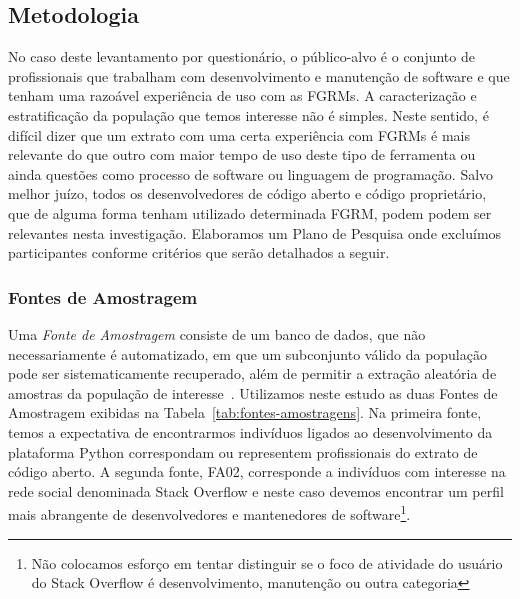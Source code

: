 \subsection{Metodologia}
\label{subsec:pesq_metodologias}

No caso deste levantamento por questionário, o público-alvo é o conjunto de
profissionais que trabalham com desenvolvimento e manutenção de software e que
tenham uma razoável experiência de uso com as FGRMs. A caracterização e
estratificação da população que temos interesse não é simples. Neste sentido, é
difícil dizer que um extrato com uma certa experiência com FGRMs é mais
relevante do que outro com maior tempo de uso deste tipo de ferramenta ou ainda
questões como processo de software ou linguagem de programação. Salvo melhor
juízo, todos os desenvolvedores de código aberto e código proprietário, que de
alguma forma tenham utilizado determinada FGRM, podem podem ser relevantes nesta
investigação. Elaboramos um Plano de Pesquisa onde excluímos participantes
conforme critérios que serão detalhados a seguir.

\subsubsection{Fontes de Amostragem}
\label{subsubsec:fontes_amostragem}

Uma \textit{Fonte de Amostragem} consiste de um banco de dados, que não
necessariamente é automatizado, em que um subconjunto válido da população pode
ser sistematicamente recuperado, além de permitir a extração aleatória de
amostras da população de interesse~\cite{de2014towards}. Utilizamos neste estudo
as duas Fontes de Amostragem exibidas na Tabela~\ref{tab:fontes-amostragens}.
Na primeira fonte, temos a expectativa de encontrarmos indivíduos ligados ao
desenvolvimento da plataforma Python correspondam ou representem profissionais
do extrato de código aberto. A segunda fonte, FA02, corresponde a indivíduos com
interesse na rede social denominada Stack Overflow e neste caso devemos
encontrar um perfil mais abrangente de desenvolvedores e mantenedores de
software\footnote{Não colocamos esforço em tentar distinguir se o foco de
	atividade do usuário do Stack Overflow é desenvolvimento, manutenção ou
	outra categoria}.

\begin{table}[htpb]
\centering
{}
\caption{Fontes de Amostragem utilizadas no levantamento com questionário.}
\label{tab:fontes-amostragens}
\end{table}


